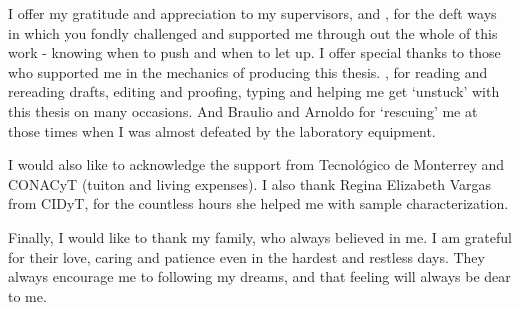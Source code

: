 \documentclass[
11pt, 
oneside,
english,
onehalfspacing,
onehalfspacing,
parskip,
headsepline,
]{MastersDoctoralThesis}
\begin{document}
\begin{acknowledgements}


I offer my gratitude and appreciation to my supervisors, \supname \textit{ } and \cosupname, for the deft ways in which you fondly challenged and supported me through out the whole of this work - knowing when to push and when to let up. I offer special thanks to those who supported me in the mechanics of producing this thesis. \supname, for reading and rereading drafts, editing and proofing, typing and helping me get ‘unstuck’ with this thesis on many occasions. And Braulio and Arnoldo for ‘rescuing’ me at those times when I was almost defeated by the laboratory equipment.

I would also like to acknowledge the support from Tecnológico de Monterrey and CONACyT (tuiton and living expenses). I also thank Regina Elizabeth Vargas from CIDyT, for the countless hours she helped me with sample characterization.

Finally, I would like to thank my family, who always believed in me. I am grateful for their love, caring and patience even in the hardest and restless days. They always encourage me to following my dreams, and that feeling will always be dear to me.

\end{acknowledgements}
\end{document}
